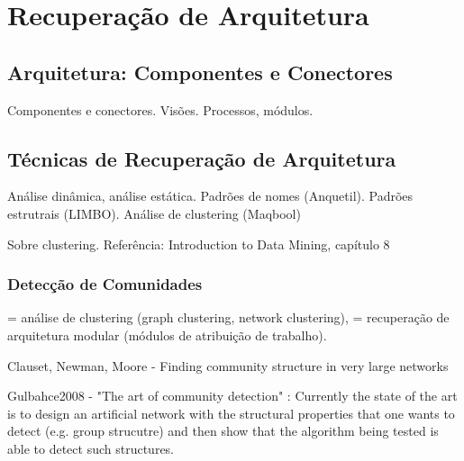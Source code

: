 \documentclass{article}
\begin{document}




\section{Recuperação de Arquitetura}

\subsection{Arquitetura: Componentes e Conectores}

Componentes e conectores.
Visões. Processos, módulos.

\subsection{Técnicas de Recuperação de Arquitetura}


Análise dinâmica, análise estática. Padrões de nomes (Anquetil). Padrões estrutrais (LIMBO). Análise de clustering (Maqbool)



Sobre clustering. Referência: Introduction to Data Mining, capítulo 8

\subsubsection{Detecção de Comunidades}

= análise de clustering (graph clustering, network clustering), = recuperação de arquitetura modular (módulos de atribuição de trabalho).

Clauset, Newman, Moore - Finding community structure in very large networks \cite{Clauset2004}

Gulbahce2008 - "The art of community detection" \cite{Gulbahce2008}: Currently the state of the art is to design an artificial network with the structural properties that one wants to detect (e.g. group strucutre) and then show that the algorithm being tested is able to detect such structures. 
\end{document}
